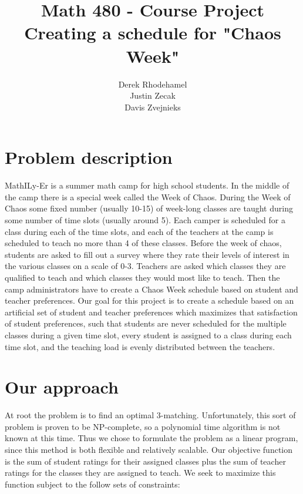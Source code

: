 \documentclass[11pt]{article}
\title{\textbf{Math 480 - Course Project}
			  \\Creating a schedule for "Chaos Week"}
\author{Derek Rhodehamel\\
		Justin Zecak\\
		Davis Zvejnieks}
\date{}
\begin{document}
\maketitle

\section{Problem description}
MathILy-Er is a summer math camp for high school students.  In the middle of the camp there is a special week called the Week of Chaos.  During the Week of Chaos some fixed number (usually 10-15) of week-long classes are taught during some number of time slots (usually around 5). Each camper is scheduled for a class during each of the time slots, and each of the teachers at the camp is scheduled to teach no more than 4 of these classes.  Before the week of chaos, students are asked to fill out a survey where they rate their levels of interest in the various classes on a scale of 0-3. Teachers are asked which classes they are qualified to teach and which classes they would most like to teach. Then the camp administrators have to create a Chaos Week schedule based on student and teacher preferences. Our goal for this project is to create a schedule based on an artificial set of student and teacher preferences which maximizes that satisfaction of student preferences, such that students are never scheduled for the multiple classes during a given time slot, every student is assigned to a class during each time slot, and the teaching load is evenly distributed between the teachers.

\section{Our approach}
At root the problem is to find an optimal 3-matching. Unfortunately, this sort of problem is proven to be NP-complete, so a polynomial time algorithm is not known at this time. Thus we chose to formulate the problem as a linear program, since this method is both flexible and relatively scalable. Our objective function is the sum of student ratings for their assigned classes plus the sum of teacher ratings for the classes they are assigned to teach. We seek to maximize this function subject to the follow sets of constraints:
\end{document}
